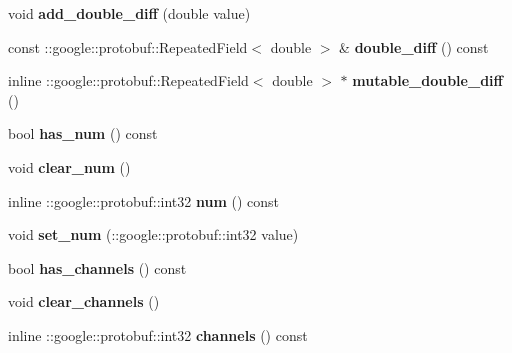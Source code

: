 \begin{DoxyCompactItemize}
void {\bfseries add\+\_\+double\+\_\+diff} (double value)
\item 
\mbox{\label{classcaffe_1_1_blob_proto_a1ffbab2533f2f715b08ba41f4c59b082}} 
const \+::google\+::protobuf\+::\+Repeated\+Field$<$ double $>$ \& {\bfseries double\+\_\+diff} () const
\item 
\mbox{\label{classcaffe_1_1_blob_proto_a60002c9a344b1002f5974f4238bc5758}} 
inline \+::google\+::protobuf\+::\+Repeated\+Field$<$ double $>$ $\ast$ {\bfseries mutable\+\_\+double\+\_\+diff} ()
\item 
\mbox{\label{classcaffe_1_1_blob_proto_aa6a41828d78615da02fc6c7e3457bed8}} 
bool {\bfseries has\+\_\+num} () const
\item 
\mbox{\label{classcaffe_1_1_blob_proto_a4e70457d14d904c67a4c06f60144bf9d}} 
void {\bfseries clear\+\_\+num} ()
\item 
\mbox{\label{classcaffe_1_1_blob_proto_aee39c6859fece9865e3ac99f717029e5}} 
inline \+::google\+::protobuf\+::int32 {\bfseries num} () const
\item 
\mbox{\label{classcaffe_1_1_blob_proto_abb28708efa83c24316ec6cbff51bd53c}} 
void {\bfseries set\+\_\+num} (\+::google\+::protobuf\+::int32 value)
\item 
\mbox{\label{classcaffe_1_1_blob_proto_ad916e13a7de09adf65cd3d8a49faab9b}} 
bool {\bfseries has\+\_\+channels} () const
\item 
\mbox{\label{classcaffe_1_1_blob_proto_af55fe190fa41be822990fd09e6095bb4}} 
void {\bfseries clear\+\_\+channels} ()
\item 
\mbox{\label{classcaffe_1_1_blob_proto_a4c199d512b46fcda05a1d6102f1610e6}} 
inline \+::google\+::protobuf\+::int32 {\bfseries channels} () const
\item 
\mbox{\label{classcaffe_1_1_blob_proto_aa89a4c761226c2da3a73386e5eca2786}} 

\end{DoxyCompactItemize}
